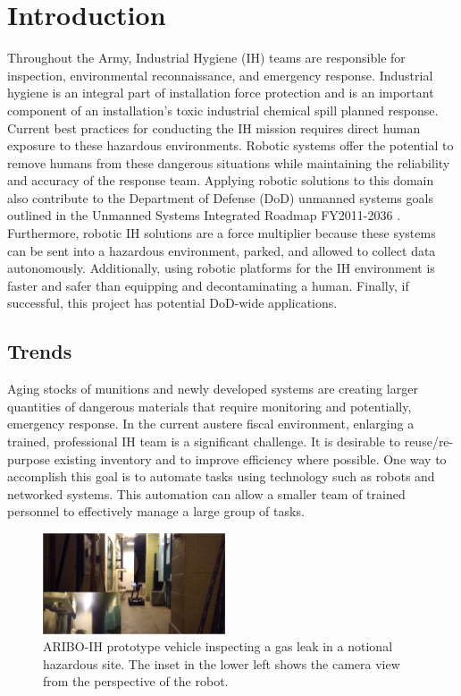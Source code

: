 \section{Introduction}\label{sec:introduction}

Throughout the Army, Industrial Hygiene (IH) teams are responsible for inspection, environmental reconnaissance, and emergency response. Industrial hygiene is an integral part of installation force protection and is an important component of an installation’s toxic industrial chemical spill planned response. Current best practices for conducting the IH mission requires direct human exposure to these hazardous environments. Robotic systems offer the potential to remove humans from these dangerous situations while maintaining the reliability and accuracy of the response team. Applying robotic solutions to this domain also contribute to the Department of Defense (DoD) unmanned systems goals outlined in the Unmanned Systems Integrated Roadmap FY2011-2036 \cite{roadmap}. Furthermore, robotic IH solutions are a force multiplier because these systems can be sent into a hazardous environment, parked, and allowed to collect data autonomously. Additionally, using robotic platforms for the IH environment is faster and safer than equipping and decontaminating a human. Finally, if successful, this project has potential DoD-wide applications. 

\subsection{Trends}

Aging stocks of munitions and newly developed systems are creating larger quantities of dangerous materials that require monitoring and potentially, emergency response. In the current austere fiscal environment, enlarging a trained, professional IH team is a significant challenge. It is desirable to reuse/re-purpose existing inventory and to improve efficiency where possible.  One way to accomplish this goal is to automate tasks using technology such as robots and networked systems. This automation can allow a smaller team of trained personnel to effectively manage a large group of tasks.

\begin{figure}
	\centering
	\includegraphics[width=0.48\textwidth]{./pictures/concept}
	\caption{ARIBO-IH prototype vehicle inspecting a gas leak in a notional hazardous site. The inset in the lower left shows the camera view from the perspective of the robot.}
	\label{fig:concept}
\end{figure}

